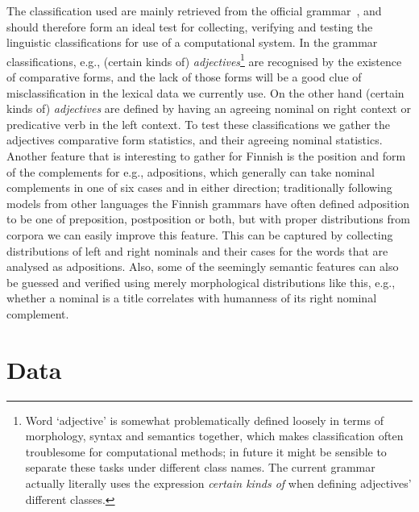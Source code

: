 \documentclass[a5paper]{article}
\begin{document}
The classification used
are mainly retrieved from the official grammar~\cite{visk}, and should
therefore form an ideal test for collecting, verifying and testing the
linguistic classifications for use of a computational system. In the grammar
classifications, e.g., (certain kinds of) \emph{adjectives}\footnote{Word
    `adjective' is somewhat problematically defined loosely in terms of
    morphology, syntax and semantics together, which makes classification often
    troublesome for computational methods; in future it might be sensible to
separate these tasks under different class names. The current grammar actually
literally uses the expression \emph{certain kinds of} when defining adjectives'
different classes.} are recognised by the existence of comparative forms, and
the lack of those forms will be a good clue of misclassification in the lexical
data we currently use. On the other hand (certain kinds of) \emph{adjectives}
are defined by having an agreeing nominal on right context or predicative verb
in the left context. To test these classifications we gather the adjectives
comparative form statistics, and their agreeing nominal statistics. Another
feature that is interesting to gather for Finnish is the position and form of
the complements for e.g., adpositions, which generally can take nominal
complements in one of six cases and in either direction; traditionally
following models from other languages the Finnish grammars have often defined
adposition to be one of preposition, postposition or both, but with proper
distributions from corpora we can easily improve this feature. This can be
captured by collecting distributions of left and right nominals and their cases
for the words that are analysed as adpositions. Also, some of the seemingly
semantic features can also be guessed and verified using merely morphological
distributions like this, e.g., whether a nominal is a title correlates with
humanness of its right nominal complement.

\section{Data}
\end{document}
